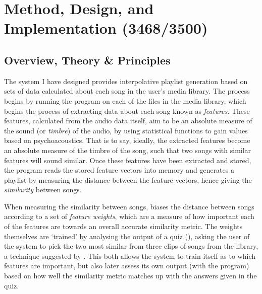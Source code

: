 \chapter{Method, Design, and Implementation (3468/3500)}
\section{Overview, Theory \& Principles}
The system I have designed provides interpolative playlist generation based on sets of data calculated about each song in the user's media library. The process begins by running the  program on each of the files in the media library, which begins the process of extracting data about each song known as \emph{features}. These features, calculated from the audio data itself, aim to be an absolute measure of the sound (or \emph{timbre}) of the audio, by using statistical functions to gain values based on psychoacoustics. That is to say, ideally, the extracted features become an absolute measure of the timbre of the song, such that two songs with similar features will sound similar. Once these features have been extracted and stored, the  program reads the stored feature vectors into memory and generates a playlist by measuring the distance between the feature vectors, hence giving the \emph{similarity} between songs.

When measuring the similarity between songs,  biases the distance between songs according to a set of \emph{feature weights}, which are a measure of how important each of the features are towards an overall accurate similarity metric. The weights themselves are `trained' by analysing the output of a quiz (), asking the user of the system to pick the two most similar from three clips of songs from the library, a technique suggested by \citet*{Novello2006}. This both allows the system to train itself as to which features are important, but also later assess its own output (with the  program) based on how well the similarity metric matches up with the answers given in the quiz.

